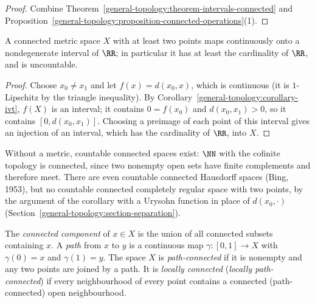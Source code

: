 \begin{proof}
Combine Theorem~\ref{general-topology:theorem-intervals-connected} and Proposition~\ref{general-topology:proposition-connected-operations}(1).
\end{proof}

\begin{corollary}\label{general-topology:corollary-connected-metric-uncountable}
A connected metric space $X$ with at least two points maps continuously onto a nondegenerate interval of $\RR$; in particular it has at least the cardinality of $\RR$, and is uncountable.
\end{corollary}

\begin{proof}
Choose $x_0 \neq x_1$ and let $f(x) = d(x_0, x)$, which is continuous (it is $1$-Lipschitz by the triangle inequality). By Corollary~\ref{general-topology:corollary-ivt}, $f(X)$ is an interval; it contains $0 = f(x_0)$ and $d(x_0, x_1) > 0$,
so it contains $[0, d(x_0, x_1)]$. Choosing a preimage of each point of this interval gives an injection of an interval, which has the cardinality of $\RR$, into $X$.
\end{proof}

\begin{counterexample}\label{general-topology:counterexample-countable-connected}
Without a metric, countable connected spaces exist: $\NN$ with the cofinite topology is connected, since two nonempty open sets have finite complements and therefore meet. There are even countable connected Hausdorff spaces (Bing,
1953), but no countable connected completely regular space with two points, by the argument of the corollary with a Urysohn function in place of $d(x_0, \cdot)$ (Section~\ref{general-topology:section-separation}).
\end{counterexample}

\begin{definition}\label{general-topology:definition-components}
The \emph{connected component} of $x \in X$ is the union of all connected subsets containing $x$. A \emph{path} from $x$ to $y$ is a continuous map
$\gamma \colon [0, 1] \to X$ with $\gamma(0) = x$ and $\gamma(1) = y$. The space $X$ is \emph{path-connected} if it is nonempty and any two points are
joined by a path. It is \emph{locally connected} (\emph{locally path-connected}) if every neighbourhood of every point contains a connected
(path-connected) open neighbourhood.
\end{definition}

